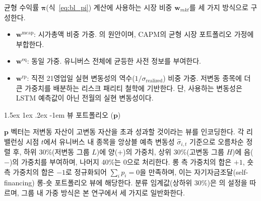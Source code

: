 \documentclass[eng]{kjas3}
\makeatletter
\newcommand\paragraph{\@startsection{paragraph}{4}{\z@}%
    {1.5ex \@plus1ex \@minus.2ex}%
    {-1em}%
    {\normalfont\normalsize\bfseries}}
\makeatother
\begin{document}
균형 수익률 $\boldsymbol{\pi}$(식~\ref{eq:bl_pi}) 계산에 사용하는 시장 비중 $\mathbf{w}_{mkt}$를 세 가지 방식으로 구성한다.

\begin{itemize}
    \item $\mathbf{w}^{\mathrm{mcap}}$: 시가총액 비중 가중. \citet{pyo2018}의 원안이며, CAPM의 균형 시장 포트폴리오 가정에 부합한다.
    \item $\mathbf{w}^{\mathrm{eq}}$: 동일 가중. 유니버스 전체에 균등한 사전 정보를 부여한다.
    \item $\mathbf{w}^{\mathrm{rp}}$: 직전 21영업일 실현 변동성의 역수($1/\sigma_{\mathrm{realized}}$) 비중 가중. 저변동 종목에 더 큰 가중치를 배분하는 리스크 패리티\citep{maillard2010} 철학에 기반한다. 단, 사용하는 변동성은 LSTM 예측값이 아닌 전월의 실현 변동성이다.
\end{itemize}

\paragraph{뷰 포트폴리오 ($\mathbf{p}$)}

$\mathbf{p}$ 벡터는 저변동 자산이 고변동 자산을 초과 성과할 것이라는 뷰를 인코딩한다. 각 리밸런싱 시점 $t$에서 유니버스 내 종목을 앙상블 예측 변동성 $\hat{\sigma}_{i,t}$ 기준으로 오름차순 정렬 후, 하위 30\%(저변동 그룹 $L$)에 양($+$)의 가중치, 상위 30\%(고변동 그룹 $H$)에 음($-$)의 가중치를 부여하며, 나머지 40\%는 0으로 처리한다. 롱 측 가중치의 합은 $+1$, 숏 측 가중치의 합은 $-1$로 정규화되어 $\sum_i p_i = 0$을 만족하며, 이는 자기자금조달(self-financing) 롱-숏 포트폴리오 뷰에 해당한다. 분류 임계값(상하위 30\%)은 \citet{pyo2018}의 설정을 따르며, 그룹 내 가중 방식은 본 연구에서 세 가지로 일반화한다.
\end{document}
